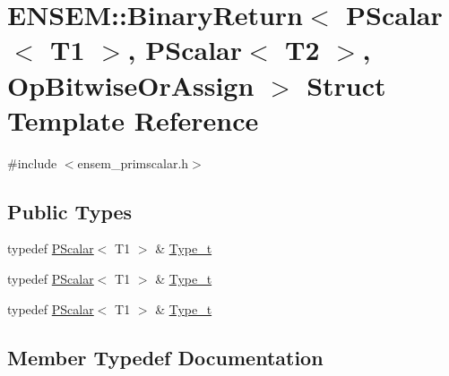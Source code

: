 \hypertarget{structENSEM_1_1BinaryReturn_3_01PScalar_3_01T1_01_4_00_01PScalar_3_01T2_01_4_00_01OpBitwiseOrAssign_01_4}{}\section{E\+N\+S\+EM\+:\+:Binary\+Return$<$ P\+Scalar$<$ T1 $>$, P\+Scalar$<$ T2 $>$, Op\+Bitwise\+Or\+Assign $>$ Struct Template Reference}
\label{structENSEM_1_1BinaryReturn_3_01PScalar_3_01T1_01_4_00_01PScalar_3_01T2_01_4_00_01OpBitwiseOrAssign_01_4}


{\ttfamily \#include $<$ensem\+\_\+primscalar.\+h$>$}

\subsection*{Public Types}
\begin{DoxyCompactItemize}
\item 
typedef \mbox{\hyperlink{classENSEM_1_1PScalar}{P\+Scalar}}$<$ T1 $>$ \& \mbox{\hyperlink{structENSEM_1_1BinaryReturn_3_01PScalar_3_01T1_01_4_00_01PScalar_3_01T2_01_4_00_01OpBitwiseOrAssign_01_4_ab7df9b27d57d2e8f2e5ba5d5354709bd}{Type\+\_\+t}}
\item 
typedef \mbox{\hyperlink{classENSEM_1_1PScalar}{P\+Scalar}}$<$ T1 $>$ \& \mbox{\hyperlink{structENSEM_1_1BinaryReturn_3_01PScalar_3_01T1_01_4_00_01PScalar_3_01T2_01_4_00_01OpBitwiseOrAssign_01_4_ab7df9b27d57d2e8f2e5ba5d5354709bd}{Type\+\_\+t}}
\item 
typedef \mbox{\hyperlink{classENSEM_1_1PScalar}{P\+Scalar}}$<$ T1 $>$ \& \mbox{\hyperlink{structENSEM_1_1BinaryReturn_3_01PScalar_3_01T1_01_4_00_01PScalar_3_01T2_01_4_00_01OpBitwiseOrAssign_01_4_ab7df9b27d57d2e8f2e5ba5d5354709bd}{Type\+\_\+t}}
\end{DoxyCompactItemize}


\subsection{Member Typedef Documentation}
\mbox{\label{structENSEM_1_1BinaryReturn_3_01PScalar_3_01T1_01_4_00_01PScalar_3_01T2_01_4_00_01OpBitwiseOrAssign_01_4_ab7df9b27d57d2e8f2e5ba5d5354709bd}} 
